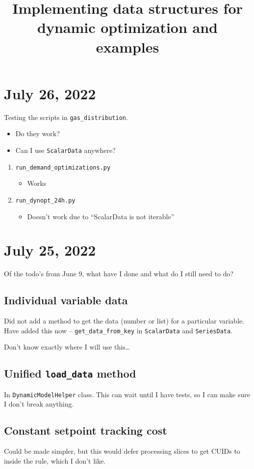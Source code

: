 \documentclass{article}
\title{Implementing data structures for dynamic optimization and examples}
\begin{document}
\maketitle

\section{July 26, 2022}
Testing the scripts in \texttt{gas\_distribution}.
\begin{itemize}
  \item Do they work?
  \item Can I use \texttt{ScalarData} anywhere? 
\end{itemize}
\begin{enumerate}
  \item \texttt{run\_demand\_optimizations.py}
    \begin{itemize}
      \item Works
    \end{itemize}
  \item \texttt{run\_dynopt\_24h.py}
    \begin{itemize}
      \item Doesn't work due to ``ScalarData is not iterable''
    \end{itemize}
\end{enumerate}

\section{July 25, 2022}
Of the todo's from June 9, what have I done and what do I still need to do?

\subsection{Individual variable data}
Did not add a method to get the data (number or list) for a particular
variable. Have added this now -- \texttt{get\_data\_from\_key}
in \texttt{ScalarData} and \texttt{SeriesData}.

Don't know exactly where I will use this\ldots

\subsection{Unified \texttt{load\_data} method}
In \texttt{DynamicModelHelper} class. This can wait until I have tests,
so I can make sure I don't break anything.

\subsection{Constant setpoint tracking cost}
Could be made simpler, but this would defer processing slices to
get CUIDs to inside the rule, which I don't like.
\end{document}

